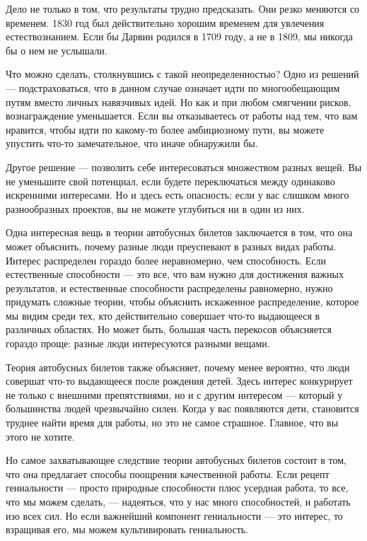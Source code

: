 \documentclass[ebook,12pt,oneside,openany]{memoir}
\begin{document}
Дело не только в том, что результаты трудно предсказать. Они резко
меняются со временем. 1830 год был действительно хорошим временем для
увлечения естествознанием. Если бы Дарвин родился в 1709 году, а не в
1809, мы никогда бы о нем не услышали. \newline

Что можно сделать, столкнувшись с такой неопределенностью? Одно из
решений — подстраховаться, что в данном случае означает идти по
многообещающим путям вместо личных навязчивых идей. Но как и при любом
смягчении рисков, вознаграждение уменьшается. Если вы отказываетесь от
работы над тем, что вам нравится, чтобы идти по какому-то более
амбициозному пути, вы можете упустить что-то замечательное, что иначе
обнаружили бы. \newline

Другое решение — позволить себе интересоваться множеством разных
вещей. Вы не уменьшите свой потенциал, если будете переключаться между
одинаково искренними интересами. Но и здесь есть опасность: если у вас
слишком много разнообразных проектов, вы не можете углубиться ни в
один из них. \newline

Одна интересная вещь в теории автобусных билетов заключается в том,
что она может объяснить, почему разные люди преуспевают в разных видах
работы. Интерес распределен гораздо более неравномерно, чем
способность. Если естественные способности — это все, что вам нужно
для достижения важных результатов, и естественные способности
распределены равномерно, нужно придумать сложные теории, чтобы
объяснить искаженное распределение, которое мы видим среди тех, кто
действительно совершает что-то выдающееся в различных областях. Но
может быть, большая часть перекосов объясняется гораздо проще: разные
люди интересуются разными вещами. \newline

Теория автобусных билетов также объясняет, почему менее вероятно, что
люди совершат что-то выдающееся после рождения детей. Здесь интерес
конкурирует не только с внешними препятствиями, но и с другим
интересом — который у большинства людей чрезвычайно силен. Когда у вас
появляются дети, становится труднее найти время для работы, но это не
самое страшное. Главное, что вы этого не хотите. \newline

Но самое захватывающее следствие теории автобусных билетов состоит в
том, что она предлагает способы поощрения качественной работы. Если
рецепт гениальности — просто природные способности плюс усердная
работа, то все, что мы можем сделать, — надеяться, что у нас много
способностей, и работать изо всех сил. Но если важнейший компонент
гениальности — это интерес, то взращивая его, мы можем культивировать
гениальность. \newline
\end{document}
